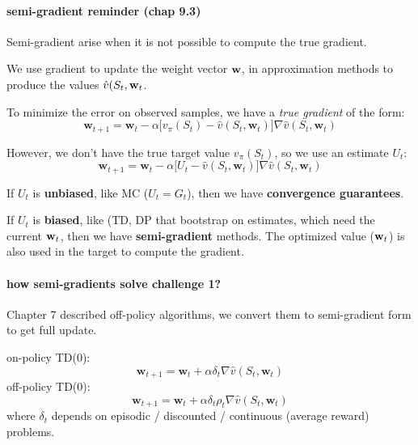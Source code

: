 \documentclass[sutton_barto_notes.tex]{subfiles}
\begin{document}
\paragraph{semi-gradient reminder (chap 9.3)}

Semi-gradient arise when it is not possible to compute the true gradient.

We use gradient to update the weight vector $\operatorname*{\mathbf{w}}$, in approximation methods to produce the values $\hat{v}(S_t, {\operatorname*{\mathbf{w}}}_t$.

To minimize the error on observed samples, we have a \textit{true gradient} of the form:
$$ \mathbf{w}_{t+1} = \mathbf{w}_t - \alpha \big[v_{\pi}(S_t) - \hat{v}(S_t, \mathbf{w}_t)\big] \nabla \hat{v}(S_t, \mathbf{w}_t) $$

However, we don't have the true target value $v_\pi(S_t)$, so we use an estimate $U_t$:
$$\mathbf{w}_{t+1} = \mathbf{w}_t - \alpha \big[U_t - \hat{v}(S_t, \mathbf{w}_t)\big] \nabla \hat{v}(S_t, \mathbf{w}_t) $$

If $U_t$ is \textbf{unbiased}, like MC ($U_t = G_t$), then we have \textbf{convergence guarantees}.

If $U_t$ is \textbf{biased}, like (TD, DP that bootstrap on estimates, which need the current ${\operatorname*{\mathbf{w}}}_t$, then we have \textbf{semi-gradient} methods. The optimized value ($\operatorname*{\mathbf{w}}_t$) is also used in the target to compute the gradient.

\paragraph{how semi-gradients solve challenge 1?}
Chapter 7 described off-policy algorithms, we convert them to semi-gradient form to get full update.

on-policy TD(0):
$$ \mathbf{w}_{t+1} = \mathbf{w}_t + \alpha \delta_t \nabla\hat{v}(S_t, \mathbf{w}_t) $$
off-policy TD(0):
$$ \mathbf{w}_{t+1} = \mathbf{w}_t + \alpha \delta_t \rho_t \nabla\hat{v}(S_t, \mathbf{w}_t) $$
where $\delta_t$ depends on episodic / discounted / continuous (average reward) problems.
\end{document}
